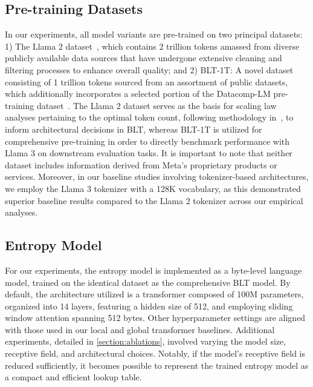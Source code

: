 \subsection{Pre-training Datasets} In our experiments, all model variants are pre-trained on two principal datasets: 1) The Llama 2 dataset~\citep{touvron2023llama}, which contains 2 trillion tokens amassed from diverse publicly available data sources that have undergone extensive cleaning and filtering processes to enhance overall quality; and 2) {\textsc BLT}-1T: A novel dataset consisting of 1 trillion tokens sourced from an assortment of public datasets, which additionally incorporates a selected portion of the Datacomp-LM pre-training dataset~\citep{li2024datacomp}. The Llama 2 dataset serves as the basis for scaling law analyses pertaining to the optimal token count, following methodology in~\cite{dubey2024llama}, to inform architectural decisions in {\textsc BLT}, whereas {\textsc BLT}-1T is utilized for comprehensive pre-training in order to directly benchmark performance with Llama 3 on downstream evaluation tasks. It is important to note that neither dataset includes information derived from Meta’s proprietary products or services. Moreover, in our baseline studies involving tokenizer-based architectures, we employ the Llama 3 tokenizer with a 128K vocabulary, as this demonstrated superior baseline results compared to the Llama 2 tokenizer across our empirical analyses.

\subsection{Entropy Model} For our experiments, the entropy model is implemented as a byte-level language model, trained on the identical dataset as the comprehensive {\textsc BLT} model. By default, the architecture utilized is a transformer composed of 100M parameters, organized into 14 layers, featuring a hidden size of 512, and employing sliding window attention spanning 512 bytes. Other hyperparameter settings are aligned with those used in our local and global transformer baselines. Additional experiments, detailed in \autoref{section:ablations}, involved varying the model size, receptive field, and architectural choices. Notably, if the model's receptive field is reduced sufficiently, it becomes possible to represent the trained entropy model as a compact and efficient lookup table.

